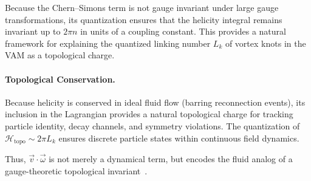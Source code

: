 Because the Chern--Simons term is not gauge invariant under large gauge transformations, its quantization ensures that the helicity integral remains invariant up to $2\pi n$ in units of a coupling constant. This provides a natural framework for explaining the quantized linking number $L_k$ of vortex knots in the VAM as a topological charge.

\paragraph{Topological Conservation.}
Because helicity is conserved in ideal fluid flow (barring reconnection events), its inclusion in the Lagrangian provides a natural topological charge for tracking particle identity, decay channels, and symmetry violations. The quantization of $\mathcal{H}_\text{topo} \sim 2\pi L_k$ ensures discrete particle states within continuous field dynamics.

Thus, $\vec{v} \cdot \vec{\omega}$ is not merely a dynamical term, but encodes the fluid analog of a gauge-theoretic topological invariant~\cite{verlinde2021qft}.